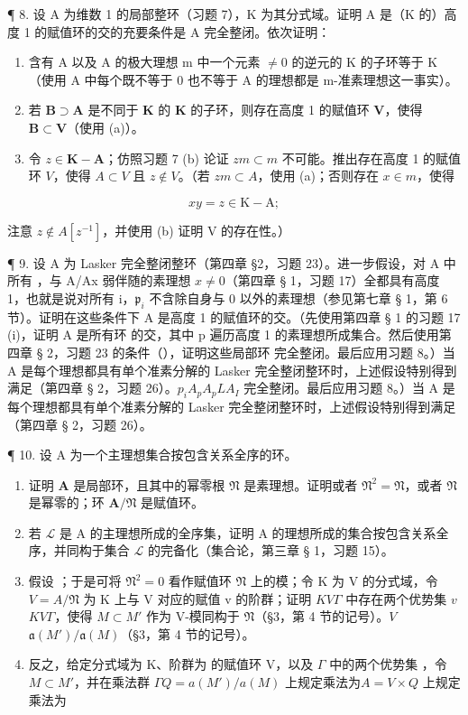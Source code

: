 ¶ 8. 设 A 为维数 1 的局部整环（习题 7），K 为其分式域。证明 A 是（K 的）高度 1 的赋值环的交的充要条件是 A 完全整闭。依次证明：

\begin{enumerate}
\def\labelenumi{(\alph{enumi})}
\item
  含有 A 以及 A 的极大理想 m 中一个元素 \(\neq0\) 的逆元的 K 的子环等于 K（使用 A 中每个既不等于 0 也不等于 A 的理想都是 m-准素理想这一事实）。
\item
  若 \(\mathbf{B} \supset \mathbf{A}\) 是不同于 \(\mathbf{K}\) 的 \(\mathbf{K}\) 的子环，则存在高度 1 的赋值环 \(\mathbf{V}\)，使得 \(\mathbf{B} \subset \mathbf{V}\)（使用 (a)）。
\item
  令 \(z \in \mathbf{K} - \mathbf{A}\)；仿照习题 7 (b) 论证 \(zm \subset m\) 不可能。推出存在高度 1 的赋值环 \(V\)，使得 \(A \subset V\) 且 \(z \notin V\)。（若 \(zm \subset A\)，使用 (a)；否则存在 \(x \in m\)，使得
\end{enumerate}

\[
x y = z \in \mathrm{K} - \mathrm{A};
\]

注意 \(z \notin A[z^{-1}]\)，并使用 (b) 证明 V 的存在性。）

¶ 9. 设 A 为 Lasker 完全整闭整环（第四章 §2，习题 23）。进一步假设，对 A 中所有 ，与 A/Ax 弱伴随的素理想 \(x \neq 0\)（第四章 § 1，习题 17）全都具有高度 1，也就是说对所有 i，\(\mathfrak{p}_i\) 不含除自身与 0 以外的素理想（参见第七章 § 1，第 6 节）。证明在这些条件下 A 是高度 1 的赋值环的交。（先使用第四章 § 1 的习题 17 (i)，证明 A 是所有环  的交，其中 p 遍历高度 1 的素理想所成集合。然后使用第四章 § 2，习题 23 的条件（），证明这些局部环  完全整闭。最后应用习题 8。）当 A 是每个理想都具有单个准素分解的 Lasker 完全整闭整环时，上述假设特别得到满足（第四章 § 2，习题 26）。\(p_{i}\)\(A_{p}\)\(A_{p}\)\(LA_{I}\) 完全整闭。最后应用习题 8。）当 A 是每个理想都具有单个准素分解的 Lasker 完全整闭整环时，上述假设特别得到满足（第四章 § 2，习题 26）。

¶ 10. 设 A 为一个主理想集合按包含关系全序的环。

\begin{enumerate}
\def\labelenumi{(\alph{enumi})}
\item
  证明 \(\mathbf{A}\) 是局部环，且其中的幂零根 \(\mathfrak{N}\) 是素理想。证明或者 \(\mathfrak{N}^2 = \mathfrak{N}\)，或者 \(\mathfrak{N}\) 是幂零的；环 \(\mathbf{A} / \mathfrak{N}\) 是赋值环。
\item
  若 \(\mathcal{L}\) 是 A 的主理想所成的全序集，证明 A 的理想所成的集合按包含关系全序，并同构于集合 \(\mathcal{L}\) 的完备化（集合论，第三章 § 1，习题 15）。
\item
  假设 ；于是可将 \(\mathfrak{N}^2 = 0\) 看作赋值环 \(\mathfrak{N}\) 上的模；令 K 为 V 的分式域，令 \(V = A / \mathfrak{N}\) 为 K 上与 V 对应的赋值 v 的阶群；证明 \(K\)\(V\)\(\Gamma\) 中存在两个优势集 \(v\)\(K\)\(V\)\(\Gamma\)，使得 \(M \subset M'\) 作为 V-模同构于 \(\mathfrak{N}\)（§3，第 4 节的记号）。\(V\)\(\mathfrak{a}(M') / \mathfrak{a}(M)\)（§3，第 4 节的记号）。
\item
  反之，给定分式域为 K、阶群为  的赋值环 V，以及 \(\Gamma\) 中的两个优势集 ，令 \(M \subset M'\)，并在乘法群 \(\Gamma\)\(Q = a(M') / a(M)\) 上规定乘法为\(A = V \times Q\) 上规定乘法为
\end{enumerate}

